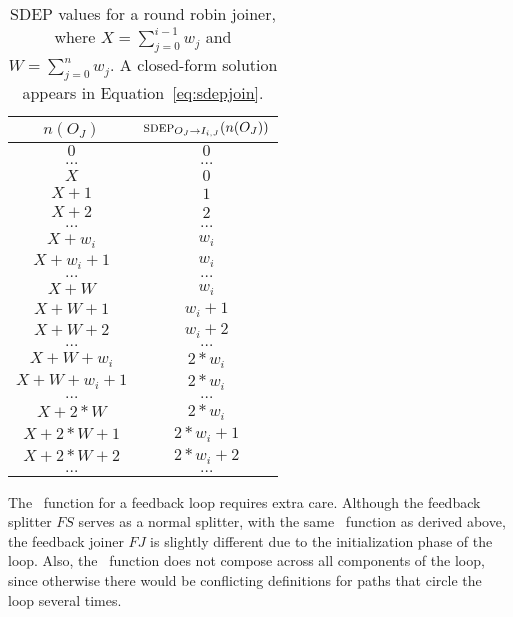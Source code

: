 \begin{table}[t]
\begin{center}
\scriptsize
\begin{tabular}{|c|c|} \hline
$n(O_J)$ & $\mi{I_{i,J}}{O_J}(n(O_J))$ \\
\hline \hline
$0$ & $0$ \\ \hline
$\dots$ & $\dots$ \\ \hline
$X$ & $0$ \\ \hline
$X + 1$ & $1$ \\ \hline
$X + 2$ & $2$ \\ \hline
$\dots$ & $\dots$ \\ \hline
$X + w_i$ & $w_i$ \\ \hline
$X + w_i + 1$ & $w_i$ \\ \hline
$\dots$ & $\dots$ \\ \hline
$X + W$ & $w_i$ \\ \hline
$X + W + 1$ & $w_i + 1$ \\ \hline
$X + W + 2$ & $w_i + 2$ \\ \hline
$\dots$ & $\dots$ \\ \hline
$X + W + w_i$ & $2 * w_i$ \\ \hline
$X + W + w_i + 1$ & $2 * w_i$ \\ \hline
$\dots$ & $\dots$ \\ \hline
$X + 2 * W$ & $2 * w_i$ \\ \hline
$X + 2 * W + 1$ & $2 * w_i + 1$ \\ \hline
$X + 2 * W + 2$ & $2 * w_i + 2$ \\ \hline
$\dots$ & $\dots$ \\ \hline
\end{tabular}
\vspace{-6pt}
\caption{\protect\small SDEP values for a round robin joiner, where $X
= \sum_{j=0}^{i-1} w_j$ and $W = \sum_{j=0}^n w_j$.  A closed-form
solution appears in Equation~\ref{eq:sdepjoin}.
\label{tab:sdepjoin}}
\vspace{-12pt}
\end{center}
\end{table}

The \sdep~function for a feedback loop requires extra care. Although
the feedback splitter $FS$ serves as a normal splitter, with the same
\sdep~function as derived above, the feedback joiner $FJ$ is slightly
different due to the initialization phase of the loop.  Also, the
\sdep~function does not compose across all components of the loop,
since otherwise there would be conflicting definitions for paths that
circle the loop several times.


